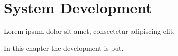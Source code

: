 \chapter{System Development}\label{ch:system-development}
Lorem ipsum dolor sit amet, consectetur adipiscing elit.

In this chapter the development is put.

